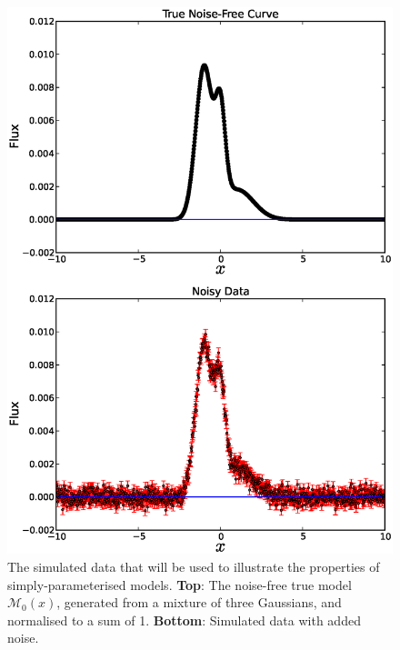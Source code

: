 \documentclass[letterpaper, 11pt]{article}
\begin{document}
\begin{figure}
\begin{center}
\includegraphics[scale=0.5]{emission_line.eps}
\end{center}
\caption{The simulated data that will be used to illustrate the properties of
simply-parameterised models. {\bf Top}: The noise-free true model $\mathcal{M}_0(x)$,
generated from a mixture of three Gaussians, and normalised to a sum of 1.
{\bf Bottom}: Simulated data with added noise.\label{emission_line}}
\end{figure}
\end{document}
